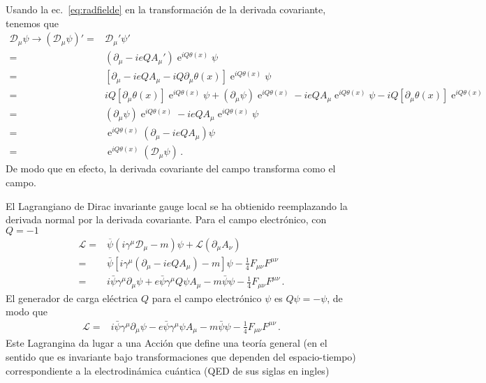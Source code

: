 \begin{frame}
Usando la ec.~\eqref{eq:radfielde} en la transformación de la derivada covariante, tenemos que
\begin{align}
 \mathcal{D}_{\mu}\psi\to \left(  \mathcal{D}_{\mu}\psi \right)'=& \mathcal{D}_{\mu}'\psi' \nonumber\\
                       =& \left( \partial_{\mu}-ieQA_{\mu}' \right)\operatorname{e}^{iQ\theta(x)}\psi \nonumber\\
  =& \left[ \partial_{\mu}-ieQA_{\mu}-iQ\partial_{\mu}\theta(x) \right]\operatorname{e}^{iQ\theta(x)}\psi \nonumber\\
  =& iQ \left[ \partial_{\mu}\theta(x) \right]\operatorname{e}^{iQ\theta(x)}\psi+\left( \partial_{\mu}\psi \right)\operatorname{e}^{iQ\theta(x)}
     -ieQA_{\mu}\operatorname{e}^{iQ\theta(x)}\psi
     -iQ \left[ \partial_{\mu}\theta(x) \right]\operatorname{e}^{iQ\theta(x)} \nonumber\\
  =&\left( \partial_{\mu}\psi \right)\operatorname{e}^{iQ\theta(x)}
     -ieQA_{\mu}\operatorname{e}^{iQ\theta(x)}\psi \nonumber\\
=& \operatorname{e}^{iQ\theta(x)}  \left( \partial_{\mu} -ieQA_{\mu}\right)\psi \nonumber\\
=& \operatorname{e}^{iQ\theta(x)} \left( \mathcal{D}_{\mu}\psi \right)\,.
\end{align}
De modo que en efecto, la derivada covariante del campo transforma como el campo.


El Lagrangiano de Dirac invariante gauge local se ha obtienido reemplazando la derivada normal por la derivada covariante. Para el campo electrónico, con $Q=-1$
\begin{align}
  \label{eq:fullqed}
  \mathcal{L}=&\overline{\psi}\left(i\gamma^\mu\mathcal{D}_\mu-m\right)\psi+\mathcal{L}\left( \partial_{\mu}A_{\nu}\right)\nonumber\\
  =&\bar{\psi}\left[i\gamma^\mu\left(\partial_\mu-ieQA_\mu\right)-m\right]\psi-\frac{1}{4}F_{\mu\nu}F^{\mu\nu}\nonumber\\
  =&i\bar{\psi}\gamma^\mu\partial_\mu\psi+e\bar{\psi}\gamma^\mu Q\psi A_\mu-m \bar{\psi} \psi-\frac{1}{4}F_{\mu\nu}F^{\mu\nu}\,.
\end{align}
El generador de carga eléctrica $Q$ para el campo electrónico $\psi$ es $Q\psi=-\psi$, de modo que
\begin{align}
  \mathcal{L}=&i\bar{\psi}\gamma^\mu\partial_\mu\psi -e\bar{\psi}\gamma^\mu \psi A_\mu-m\bar{\psi}\psi -\frac{1}{4}F_{\mu\nu}F^{\mu\nu}\,.
\end{align}
Este Lagrangina da lugar a una Acción que define una teoría general (en el sentido que es invariante bajo transformaciones que dependen del espacio-tiempo) correspondiente a  la electrodinámica cuántica (QED de sus siglas en ingles)


\end{frame}
